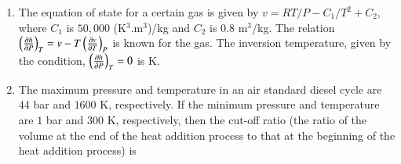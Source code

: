 \documentclass[a4paper,10pt]{article}
\begin{document}
\begin{enumerate}
    \hfill{}
    \begin{enumerate}
    \end{enumerate}

    \item The equation of state for a certain gas is given by $v = RT/P - C_1/T^2 + C_2$, where $C_1$ is $50,000$ (K$^3$.m$^3$)/kg and $C_2$ is $0.8$ m$^3$/kg. The relation $\left(\frac{\partial h}{\partial P}\right)_T = v - T\left(\frac{\partial v}{\partial T}\right)_P$ is known for the gas. The inversion temperature, given by the condition, $\left(\frac{\partial h}{\partial P}\right)_T = 0$ is \underline{\hspace{2cm}} K.
    
    \hfill{}
    \begin{enumerate}
    \end{enumerate}

    \item The maximum pressure and temperature in an air standard diesel cycle are $44$ bar and $1600$ K, respectively. If the minimum pressure and temperature are $1$ bar and $300$ K, respectively, then the cut-off ratio (the ratio of the volume at the end of the heat addition process to that at the beginning of the heat addition process) is
    
    \hfill{}
    \begin{enumerate}
    \end{enumerate}


\end{enumerate}
\end{document}
